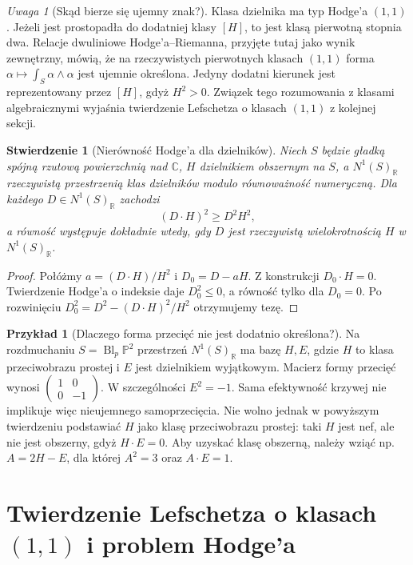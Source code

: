 \documentclass[11pt,a4paper,openany]{report}
\numberwithin{equation}{section}
\theoremstyle{plain}
\newtheorem{stwierdzenie}[twierdzenie]{Stwierdzenie}
\theoremstyle{definition}
\newtheorem{przyklad}[twierdzenie]{Przykład}
\theoremstyle{remark}
\newtheorem{uwaga}[twierdzenie]{Uwaga}
\newcommand{\R}{\mathbb R}
\newcommand{\C}{\mathbb C}
\newcommand{\PP}{\mathbb P}
\begin{document}
\begin{uwaga}[Skąd bierze się ujemny znak?]
Klasa dzielnika ma typ Hodge'a $(1,1)$.
Jeżeli jest prostopadła do dodatniej klasy $[H]$, to jest
klasą pierwotną stopnia dwa. Relacje dwuliniowe
Hodge'a--Riemanna, przyjęte tutaj jako wynik zewnętrzny,
mówią, że na rzeczywistych pierwotnych klasach $(1,1)$
forma $\alpha\mapsto\int_S\alpha\wedge\alpha$ jest ujemnie
określona. Jedyny dodatni kierunek jest reprezentowany
przez $[H]$, gdyż $H^2>0$. Związek tego rozumowania
z klasami algebraicznymi wyjaśnia twierdzenie Lefschetza
o klasach $(1,1)$ z kolejnej sekcji.
\end{uwaga}

\begin{stwierdzenie}[Nierówność Hodge'a dla dzielników]
\label{st:ga10-hodge-ineq}
Niech $S$ będzie gładką spójną rzutową powierzchnią
nad $\C$, $H$ dzielnikiem obszernym na $S$,
a $N^1(S)_{\R}$ rzeczywistą przestrzenią klas dzielników
modulo równoważność numeryczną. Dla każdego
$D\in N^1(S)_{\R}$ zachodzi
\[
 (D\cdot H)^2\ge D^2H^2,
\]
a równość występuje dokładnie wtedy, gdy $D$ jest
rzeczywistą wielokrotnością $H$ w $N^1(S)_{\R}$.
\end{stwierdzenie}
\begin{proof}
Połóżmy $a=(D\cdot H)/H^2$ i $D_0=D-aH$.
Z konstrukcji $D_0\cdot H=0$.
Twierdzenie Hodge'a o indeksie daje $D_0^2\le0$,
a równość tylko dla $D_0=0$. Po rozwinięciu
$D_0^2=D^2-(D\cdot H)^2/H^2$ otrzymujemy tezę.
\end{proof}

\begin{przyklad}[Dlaczego forma przecięć nie jest dodatnio określona?]
Na rozdmuchaniu $S=\operatorname{Bl}_p\PP^2$
przestrzeń $N^1(S)_{\R}$ ma bazę $H,E$,
gdzie $H$ to klasa przeciwobrazu prostej i $E$ jest dzielnikiem
wyjątkowym. Macierz formy przecięć wynosi
$\left(\begin{smallmatrix}1&0\\0&-1\end{smallmatrix}\right)$.
W szczególności $E^2=-1$. Sama efektywność krzywej
nie implikuje więc nieujemnego samoprzecięcia.
Nie wolno jednak w powyższym twierdzeniu podstawiać
$H$ jako klasę przeciwobrazu prostej: taki $H$ jest nef, ale
nie jest obszerny, gdyż $H\cdot E=0$.
Aby uzyskać klasę obszerną, należy wziąć np.
$A=2H-E$, dla której $A^2=3$ oraz $A\cdot E=1$.
\end{przyklad}

\section{Twierdzenie Lefschetza o klasach \texorpdfstring{$(1,1)$}{(1,1)} i problem Hodge'a}
\label{sec:ga10-11}
\end{document}
